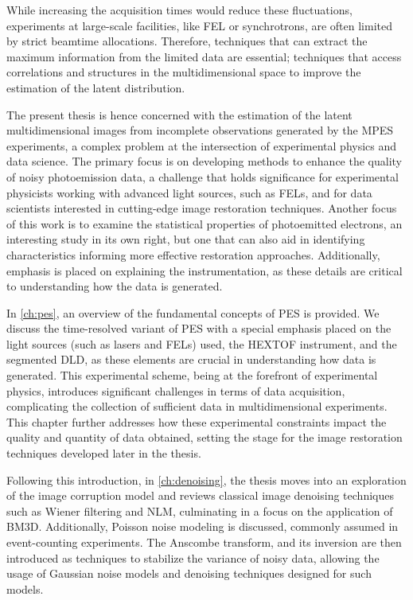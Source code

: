 While increasing the acquisition times would reduce these fluctuations, experiments at large-scale facilities, like \gls{FEL} or synchrotrons, are often limited by strict \gls{beamtime} allocations. Therefore, techniques that can extract the maximum information from the limited data are essential; techniques that access correlations and structures in the multidimensional space to improve the estimation of the latent distribution.

The present thesis is hence concerned with the estimation of the latent multidimensional images from incomplete observations generated by the \gls{MPES} experiments, a complex problem at the intersection of experimental physics and data science. The primary focus is on developing methods to enhance the quality of noisy photoemission data, a challenge that holds significance for experimental physicists working with advanced light sources, such as \glspl{FEL}, and for data scientists interested in cutting-edge image restoration techniques. Another focus of this work is to examine the statistical properties of photoemitted electrons, an interesting study in its own right, but one that can also aid in identifying characteristics informing more effective restoration approaches. Additionally, emphasis is placed on explaining the instrumentation, as these details are critical to understanding how the data is generated.

In \cref{ch:pes}, an overview of the fundamental concepts of \gls{PES} is provided. We discuss the time-resolved variant of \gls{PES} with a special emphasis placed on the light sources (such as lasers and \glspl{FEL}) used, the \gls{HEXTOF} instrument, and the segmented \gls{DLD}, as these elements are crucial in understanding how data is generated. This experimental scheme, being at the forefront of experimental physics, introduces significant challenges in terms of data acquisition, complicating the collection of sufficient data in multidimensional experiments. This chapter further addresses how these experimental constraints impact the quality and quantity of data obtained, setting the stage for the image restoration techniques developed later in the thesis.

Following this introduction, in \cref{ch:denoising}, the thesis moves into an exploration of the image corruption model and reviews  classical image denoising techniques such as Wiener filtering and \gls{NLM}, culminating in a focus on the application of \gls{BM3D}. Additionally, Poisson noise modeling is discussed, commonly assumed in event-counting experiments. The Anscombe transform, and its inversion are then introduced as techniques to stabilize the variance of noisy data, allowing the usage of Gaussian noise models and denoising techniques designed for such models.

